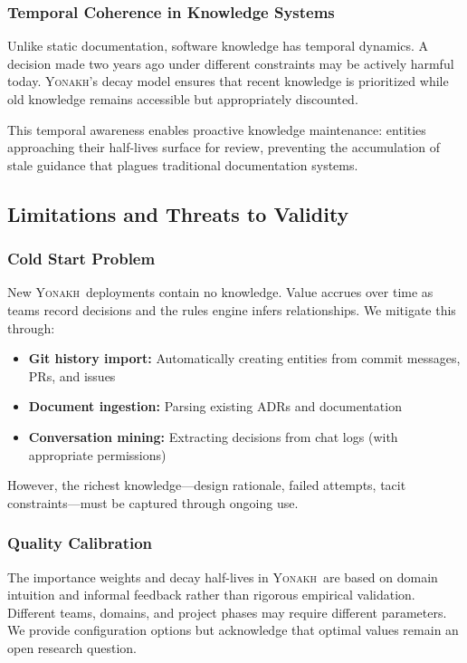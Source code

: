 \documentclass[10pt,journal,compsoc]{IEEEtran}
\newcommand{\yonakh}{\textsc{Yonakh}}
\begin{document}
\subsubsection{Temporal Coherence in Knowledge Systems}

Unlike static documentation, software knowledge has temporal dynamics. A decision made two years ago under different constraints may be actively harmful today. \yonakh's decay model ensures that recent knowledge is prioritized while old knowledge remains accessible but appropriately discounted.

This temporal awareness enables proactive knowledge maintenance: entities approaching their half-lives surface for review, preventing the accumulation of stale guidance that plagues traditional documentation systems.

\subsection{Limitations and Threats to Validity}

\subsubsection{Cold Start Problem}

New \yonakh\ deployments contain no knowledge. Value accrues over time as teams record decisions and the rules engine infers relationships. We mitigate this through:

\begin{itemize}
\item \textbf{Git history import:} Automatically creating entities from commit messages, PRs, and issues
\item \textbf{Document ingestion:} Parsing existing ADRs and documentation
\item \textbf{Conversation mining:} Extracting decisions from chat logs (with appropriate permissions)
\end{itemize}

However, the richest knowledge---design rationale, failed attempts, tacit constraints---must be captured through ongoing use.

\subsubsection{Quality Calibration}

The importance weights and decay half-lives in \yonakh\ are based on domain intuition and informal feedback rather than rigorous empirical validation. Different teams, domains, and project phases may require different parameters. We provide configuration options but acknowledge that optimal values remain an open research question.
\end{document}
